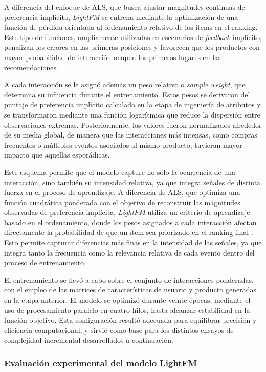 A diferencia del enfoque de ALS, que busca ajustar magnitudes continuas de preferencia implícita, \textit{LightFM} se entrena mediante la optimización de una función de pérdida orientada al ordenamiento relativo de los ítems en el ranking. Este tipo de funciones, ampliamente utilizadas en escenarios de \textit{feedback} implícito, penalizan los errores en las primeras posiciones y favorecen que los productos con mayor probabilidad de interacción ocupen los primeros lugares en las recomendaciones.

A cada interacción se le asignó además un peso relativo o \textit{sample weight}, que determina su influencia durante el entrenamiento. Estos pesos se derivaron del puntaje de preferencia implícito calculado en la etapa de ingeniería de atributos y se transformaron mediante una función logarítmica que reduce la dispersión entre observaciones extremas. Posteriormente, los valores fueron normalizados alrededor de su media global, de manera que las interacciones más intensas, como compras frecuentes o múltiples eventos asociados al mismo producto, tuvieran mayor impacto que aquellas esporádicas.  

Este esquema permite que el modelo capture no sólo la ocurrencia de una interacción, sino también su intensidad relativa, ya que integra señales de distinta fuerza en el proceso de aprendizaje. A diferencia de ALS, que optimiza una función cuadrática ponderada con el objetivo de reconstruir las magnitudes observadas de preferencia implícita, \textit{LightFM} utiliza un criterio de aprendizaje basado en el ordenamiento, donde los pesos asignados a cada interacción afectan directamente la probabilidad de que un ítem sea priorizado en el ranking final \cite{ARTICLE:Rendle2009, ARTICLE:LightFM2015}. Esto permite capturar diferencias más finas en la intensidad de las señales, ya que integra tanto la frecuencia como la relevancia relativa de cada evento dentro del proceso de entrenamiento.

El entrenamiento se llevó a cabo sobre el conjunto de interacciones ponderadas, con el empleo de las matrices de características de usuario y producto generadas en la etapa anterior. El modelo se optimizó durante veinte épocas, mediante el uso de procesamiento paralelo en cuatro hilos, hasta alcanzar estabilidad en la función objetivo. Esta configuración resultó adecuada para equilibrar precisión y eficiencia computacional, y sirvió como base para los distintos ensayos de complejidad incremental desarrollados a continuación.

\subsubsection{Evaluación experimental del modelo LightFM}

